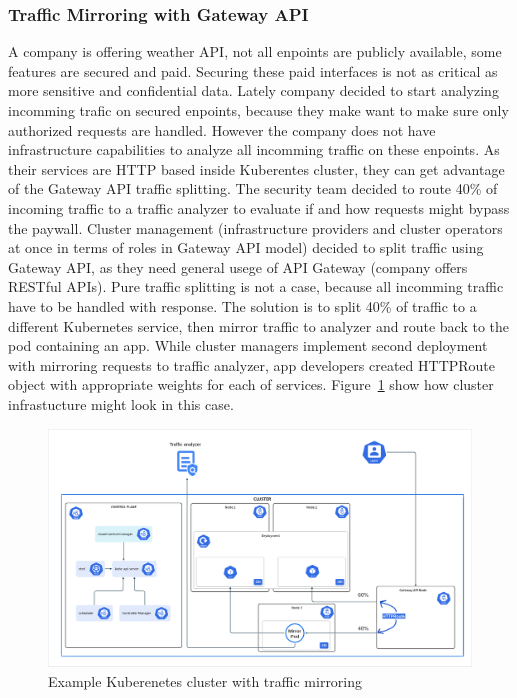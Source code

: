 \subsubsection{Traffic Mirroring with Gateway API}
\label{subsubsection:mirroring}

A company is offering weather API, not all enpoints are publicly available, some features are secured and paid. Securing these paid interfaces is not as critical as more sensitive and confidential data. Lately company decided to start analyzing incomming trafic on secured enpoints, because they make want to make sure only authorized requests are handled. However the company does not have infrastructure capabilities to analyze all incomming traffic on these enpoints. As their services are HTTP based inside Kuberentes cluster, they can get advantage of the Gateway API traffic splitting. The security team decided to route 40\% of incoming traffic to a traffic analyzer to evaluate if and how requests might bypass the paywall. Cluster management (infrastructure providers and cluster operators at once in terms of roles in Gateway API model) decided to split traffic using Gateway API, as they need general usege of API Gateway (company offers RESTful APIs). Pure traffic splitting is not a case, because all incomming traffic have to be handled with response. The solution is to split 40\% of traffic to a different Kubernetes service, then mirror traffic to analyzer and route back to the pod containing an app. While cluster managers implement second deployment with mirroring requests to traffic analyzer, app developers created HTTPRoute object with appropriate weights for each of services. Figure~\ref{fig:mirroringImg} show how cluster infrastucture might look in this case.


\begin{figure}[H]
    \centering
    \includegraphics[width=1\columnwidth]{images/ingress.png}
    \caption{Example Kuberenetes cluster with traffic mirroring}
    \label{fig:mirroringImg}
\end{figure}

